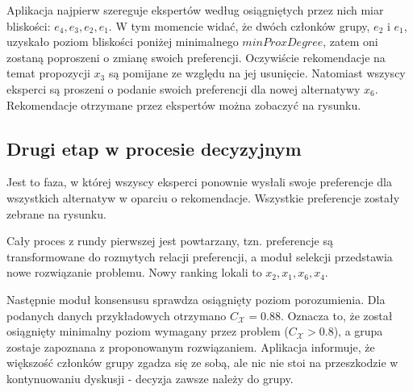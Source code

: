 Aplikacja najpierw szereguje ekspertów według osiągniętych przez nich miar
bliskości: $e_4, e_3, e_2, e_1$. W tym momencie widać, że dwóch członków grupy,
$e_2$ i $e_1$, uzyskało poziom bliskości poniżej minimalnego $minProxDegree$,
zatem oni zostaną poproszeni o zmianę swoich preferencji. Oczywiście
rekomendacje na temat propozycji $x_3$ są pomijane ze względu na jej usunięcie.
Natomiast wszyscy eksperci są proszeni o podanie swoich preferencji dla nowej
alternatywy $x_6$. Rekomendacje otrzymane przez ekspertów można zobaczyć na
rysunku. 

\subsection{Drugi etap w procesie decyzyjnym}
Jest to faza, w której wszyscy eksperci ponownie wysłali swoje preferencje dla
wszystkich alternatyw w oparciu o rekomendacje. Wszystkie preferencje zostały
zebrane na rysunku. 

Cały proces z rundy pierwszej jest powtarzany, tzn. preferencje są
transformowane do rozmytych relacji preferencji, a moduł selekcji przedstawia
nowe rozwiązanie problemu. Nowy ranking lokali to $x_2, x_1, x_6, x_4$.

Następnie moduł konsensusu sprawdza osiągnięty poziom porozumienia. Dla podanych
danych przykładowych otrzymano $C_{\mathcal{X}} = 0.88$. Oznacza to, że został
osiągnięty minimalny poziom wymagany przez problem ($C_{\mathcal{X}} > 0.8$),
a grupa zostaje zapoznana z proponowanym rozwiązaniem. Aplikacja informuje, że
większość członków grupy zgadza się ze sobą, ale nic nie stoi na przeszkodzie w
kontynuowaniu dyskusji - decyzja zawsze należy do grupy.

